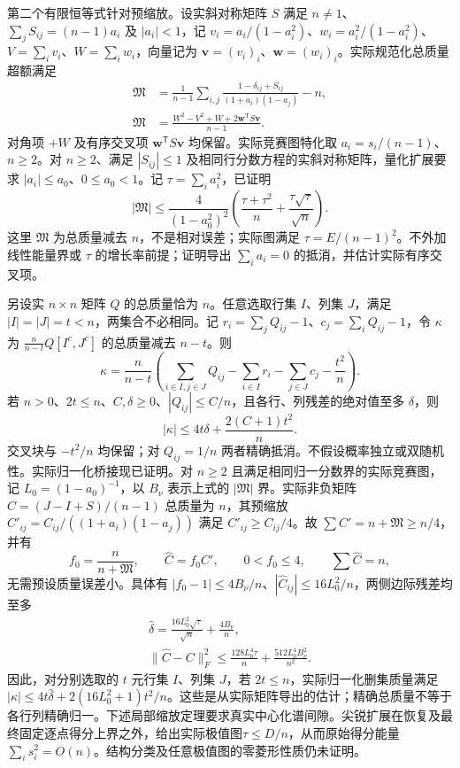 \documentclass[UTF8,11pt,fontset=fandol]{ctexart}
\begin{document}
第二个有限恒等式针对预缩放。设实斜对称矩阵 $S$ 满足 $n\ne1$、$\sum_jS_{ij}=(n-1)a_i$ 及 $|a_i|<1$，记 $v_i=a_i/(1-a_i^2)$、$w_i=a_i^2/(1-a_i^2)$、$V=\sum_iv_i$、$W=\sum_iw_i$，向量记为 $\mathbf v=(v_i)_i$、$\mathbf w=(w_i)_i$。实际规范化总质量超额满足
\[
 \begin{aligned}
 \mathfrak M&=\frac1{n-1}\sum_{i,j}
 \frac{1-\delta_{ij}+S_{ij}}{(1+a_i)(1-a_j)}-n,\\
 \mathfrak M&=\frac{W^2-V^2+W+2\mathbf w^{\mathsf T}S\mathbf v}{n-1}.
 \end{aligned}
\]
对角项 $+W$ 及有序交叉项 $\mathbf w^{\mathsf T}S\mathbf v$ 均保留。实际竞赛图特化取 $a_i=s_i/(n-1)$、$n\ge2$。对 $n\ge2$、满足 $|S_{ij}|\le1$ 及相同行分数方程的实斜对称矩阵，量化扩展要求 $|a_i|\le a_0$、$0\le a_0<1$。记 $\tau=\sum_i a_i^2$，已证明
\[
 |\mathfrak M|\le\frac{4}{(1-a_0^2)^2}
 \left(\frac{\tau+\tau^2}{n}+\frac{\tau\sqrt\tau}{\sqrt n}\right).
\]
这里 $\mathfrak M$ 为总质量减去 $n$，不是相对误差；实际图满足 $\tau=E/(n-1)^2$。不外加线性能量界或 $\tau$ 的增长率前提；证明导出 $\sum_i a_i=0$ 的抵消，并估计实际有序交叉项。

另设实 $n\times n$ 矩阵 $Q$ 的总质量恰为 $n$。任意选取行集 $I$、列集 $J$，满足 $|I|=|J|=t<n$，两集合不必相同。记 $r_i=\sum_jQ_{ij}-1$、$c_j=\sum_iQ_{ij}-1$，令 $\kappa$ 为 $\frac n{n-t}Q[I^c,J^c]$ 的总质量减去 $n-t$。则
\[
 \kappa=\frac n{n-t}\left(\sum_{i\in I,j\in J}Q_{ij}
       -\sum_{i\in I}r_i-\sum_{j\in J}c_j-\frac{t^2}{n}\right).
\]
若 $n>0$、$2t\le n$、$C,\delta\ge0$、$|Q_{ij}|\le C/n$，且各行、列残差的绝对值至多 $\delta$，则
\[
 |\kappa|\le4t\delta+\frac{2(C+1)t^2}{n}.
\]
交叉块与 $-t^2/n$ 均保留；对 $Q_{ij}=1/n$ 两者精确抵消。不假设概率独立或双随机性。实际归一化桥接现已证明。对 $n\ge2$ 且满足相同归一分数界的实际竞赛图，记 $L_0=(1-a_0)^{-1}$，以 $B_\nu$ 表示上式的 $|\mathfrak M|$ 界。实际非负矩阵 $C=(J-I+S)/(n-1)$ 总质量为 $n$，其预缩放 $C'_{ij}=C_{ij}/((1+a_i)(1-a_j))$ 满足 $C'_{ij}\ge C_{ij}/4$。故 $\sum C'=n+\mathfrak M\ge n/4$，并有
\[
 f_0=\frac n{n+\mathfrak M},\qquad \widehat C=f_0C',\qquad
 0<f_0\le4,\qquad \sum\widehat C=n,
\]
无需预设质量误差小。具体有 $|f_0-1|\le4B_\nu/n$、$|\widehat C_{ij}|\le16L_0^2/n$，两侧边际残差均至多
\[
 \begin{gathered}
 \widehat\delta=\frac{16L_0^2\sqrt\tau}{\sqrt n}+\frac{4B_\nu}{n},\\
 \|\widehat C-C\|_F^2\le
 \frac{128L_0^4\tau}{n}+\frac{512L_0^4B_\nu^2}{n^2}.
 \end{gathered}
\]
因此，对分别选取的 $t$ 元行集 $I$、列集 $J$，若 $2t\le n$，实际归一化删集质量满足 $|\kappa|\le4t\widehat\delta+2(16L_0^2+1)t^2/n$。这些是从实际矩阵导出的估计；精确总质量不等于各行列精确归一。下述局部缩放定理要求真实中心化谱间隙。尖锐扩展在恢复及最终固定逐点得分上界之外，给出实际极值图$\tau\le D/n$，从而原始得分能量$\sum_i s_i^2=O(n)$。结构分类及任意极值图的零菱形性质仍未证明。
\end{document}
